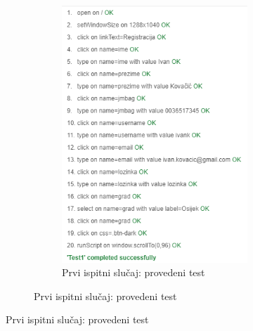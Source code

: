 	 		\begin{figure}[H]		
	 			\begin{figure}[H]
	 				\begin{subfigure}{0.5\textwidth}
	 					\centering
	 					\includegraphics[scale=0.7]{slike/test1.png}
	 					\caption{Prvi ispitni slučaj: provedeni test}
	 					\label{fig:prviIspitniSlucajTest}
	 				\end{subfigure}%
	 			\end{figure}
	 		\end{figure}
	 	
	 		
 		
